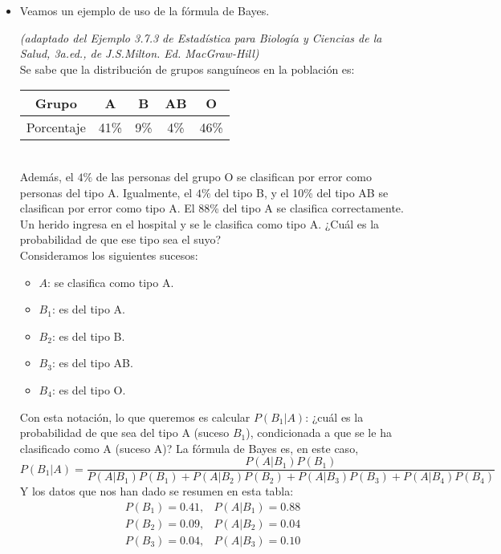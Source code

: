 \begin{itemize}
        \item Veamos un ejemplo de uso de la fórmula de Bayes.
        \begin{Ejemplo}{\em  (adaptado del Ejemplo 3.7.3 de  {\em Estadística para Biología y Ciencias de la Salud, 3a.ed.}, de J.S.Milton. Ed. MacGraw-Hill)}\\[2mm]
            Se sabe que la distribución de grupos sanguíneos en la población es:\\[3mm]
            \begin{tabular}{|c|c|c|c|c|}
            \hline
            Grupo&A&B&AB&O\\
            \hline
            Porcentaje&41\%&9\%&4\%&46\%\\
            \hline
            \end{tabular}\\[2mm]
            Además, el $4\%$ de las personas del grupo O se clasifican por error como personas del tipo A. Igualmente, el $4\%$ del tipo B, y el 10\% del tipo AB se clasifican por error como tipo A. El 88\% del tipo A se clasifica correctamente. Un herido ingresa en el hospital y se le clasifica como tipo A. ¿Cuál es la probabilidad de que ese tipo sea el suyo?\\
            Consideramos los siguientes sucesos:
            \begin{itemize}
                \item $A$: se clasifica como tipo A.
                \item $B_1$: es del tipo A.
                \item $B_2$: es del tipo B.
                \item $B_3$: es del tipo AB.
                \item $B_4$: es del tipo O.
            \end{itemize}
            Con esta notación, lo que queremos es calcular $P(B_1|A)$: ¿cuál es la probabilidad de que sea del tipo A (suceso $B_1$), condicionada a que se le ha clasificado como A (suceso A)? La fórmula de Bayes es, en este caso,
            \[P(B_1|A)=\dfrac{P(A|B_1)P(B_1)}{P(A|B_1)P(B_1)+P(A|B_2)P(B_2)+P(A|B_3)P(B_3)+P(A|B_4)P(B_4)}\]
            Y los datos que nos han dado se resumen en esta tabla:
            \[\begin{array}{cc}
            P(B_1)=0.41,&P(A|B_1)=0.88\\
            P(B_2)=0.09,&P(A|B_2)=0.04\\
            P(B_3)=0.04,&P(A|B_3)=0.10\\

\end{array}\]
\end{Ejemplo}
\end{itemize}
